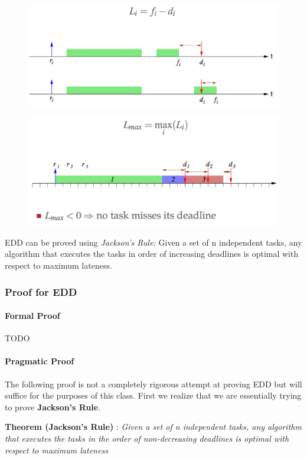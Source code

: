 \documentclass{hw}
\begin{document}
\begin{figure}[H]
  \centering
  \includegraphics[scale=.6]{img/edd}
\end{figure}
\begin{figure}[H]
  \centering
  \includegraphics[scale=.6]{img/edd2}
\end{figure}
EDD can be proved using \emph{Jackson's Rule:} Given a set of n independent
tasks, any algorithm that executes the tasks in order of increasing deadlines
is optimal with respect to maximum lateness.

\subsubsection{Proof for EDD}
\paragraph{Formal Proof}
TODO

\paragraph{Pragmatic Proof}
The following proof is not a completely rigorous attempt at proving EDD but
will suffice for the purposes of this class. First we realize that we are
essentially trying to prove \textbf{Jackson's Rule}.

\textbf{Theorem (Jackson's Rule)} : \textit{Given a set of n independent tasks,
any algorithm that executes the tasks in the order of non-decreasing deadlines
is optimal with respect to maximum lateness} 
\end{document}
